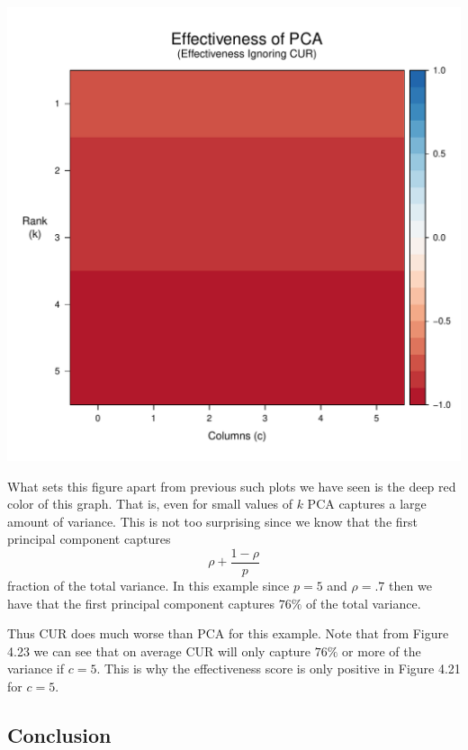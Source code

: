 \documentclass{book}
\begin{document}
\begin{center}
\includegraphics[scale=.63]{./Figures/cs_ex_1/raster_pca.pdf}
\end{center}

What sets this figure apart from previous such plots we have seen is the deep red color of this graph. That is, even for small values of $k$ PCA captures a large amount of variance. This is not too surprising since we know that the first principal component captures
$$
\rho+\frac{1-\rho}{p}
$$
fraction of the total variance. In this example since $p=5$ and $\rho=.7$ then we have that the first principal component captures $76\%$ of the total variance. 

Thus CUR does much worse than PCA for this example. Note that from Figure 4.23 we can see that on average CUR will only capture $76\%$ or more of the variance if $c=5$. This is why the effectiveness score is only positive in Figure 4.21 for $c=5$.

\newpage
\subsection{Conclusion}
\end{document}
